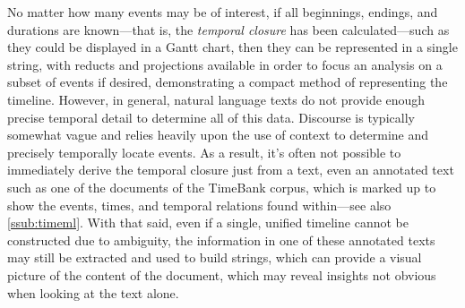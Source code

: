 \documentclass[a4paper,12pt,leqno]{article}
\begin{document}
No matter how many events may be of interest, if all beginnings, endings, and durations are known---that is, the \textit{temporal closure} has been calculated---such as they could be displayed in a Gantt chart, then they can be represented in a single string, with reducts and projections available in order to focus an analysis on a subset of events if desired, demonstrating a compact method of representing the timeline. However, in general, natural language texts do not provide enough precise temporal detail to determine all of this data. Discourse is typically somewhat vague and relies heavily upon the use of context to determine and precisely temporally locate events. As a result, it's often not possible to immediately derive the temporal closure just from a text, even an annotated text such as one of the documents of the TimeBank \citep{pustejovsky2006timebank} corpus, which is marked up to show the events, times, and temporal relations found within---see also \cref{ssub:timeml}. With that said, even if a single, unified timeline cannot be constructed due to ambiguity, the information in one of these annotated texts may still be extracted and used to build strings, which can provide a visual picture of the content of the document, which may reveal insights not obvious when looking at the text alone.
\end{document}
